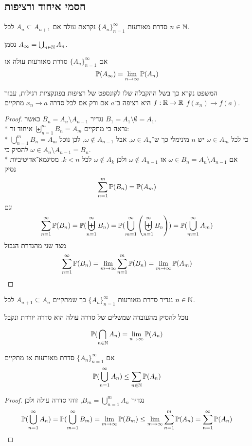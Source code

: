 \subsection{חסמי איחוד ורציפות}
\begin{definition}
	סדרת מאורעות ${\{A_n\}}_{n = 1}^\infty$ נקראת עולה אם $A_n \subseteq A_{n + 1}$ לכל $n \in \mathbb{N}$.
\end{definition}
\begin{notation}
	נסמן $A_\infty = \bigcup_{n \in \mathbb{N}} A_n$.
\end{notation}
\begin{theorem}
	אם ${\{A_n\}}_{n = 1}^\infty$ סדרת מאורעות עולה אז
	\[
		\mathbb{P}(A_\infty) = \lim_{n \to \infty} \mathbb{P}(A_n)
	\]
\end{theorem}
המשפט נקרא כך בשל ההקבלה שלו לקונספט של רציפות בפונקציות רגילות, עבור $f : \mathbb{R} \to \mathbb{R}$ היא רציפה ב־$a$ אם ורק אם לכל סדרה $x_n \to a$ מתקיים $f(x_n) \to f(a)$.
\begin{proof}
	נגדיר $B_n = A_n \setminus A_{n - 1}$ כאשר $B_1 = A_1 \setminus \emptyset = A_1$. \\*
	נראה כי מתקיים $\biguplus_{n = 1}^m B_n = A_m$ איחוד זר: \\*
	$\bigcup_{n = 1}^m B_n = A_m$ כי לכל $\omega \in A_m$ יש $n$ מינימלי כך ש־$\omega \in A_n$, אבל $\omega \notin A_{n - 1}$, לכן נוכל להסיק כי $\omega \in A_n \setminus A_{n - 1} = B_n$. \\*
	אם $\omega \in B_n = A_n \setminus A_{n - 1}$ אז $\omega \notin A_{n - 1}$ ולכן $\omega \notin A_k$ לכל $k < n$.
	מסיגמא־אדיטיביות נסיק
	\[
		\sum_{n = 1}^{m} \mathbb{P}(B_n) = \mathbb{P}(A_m)
	\]
	וגם
	\[
		\sum_{n = 1}^{\infty} \mathbb{P}(B_n)
		= \mathbb{P}(\biguplus_{n = 1}^\infty B_n)
		= \mathbb{P}(\bigcup_{m = 1}^\infty \left(\biguplus_{n = 1}^\infty B_n\right))
		= \mathbb{P}(\bigcup_{m = 1}^\infty A_m)
	\]
	מצד שני מהגדרת הגבול
	\[
		\sum_{n = 1}^{\infty} \mathbb{P}(B_n)
		= \lim_{m \to \infty} \sum_{n = 1}^{m}  \mathbb{P}(B_n)
		= \lim_{m \to \infty} \mathbb{P}(A_m)
	\]
\end{proof}
\begin{definition}
	נגדיר סדרת מאורעות ${\{A_n\}}_{n = 1}^\infty$ כך שמתקיים $A_{n + 1} \subseteq A_n$ לכל $n \in \mathbb{N}$.
\end{definition}
נוכל להסיק מהעובדה שמשלים של סדרה עולה הוא סדרה יורדת ונקבל
\begin{proposition}
	\[
		\mathbb{P}(\bigcap_{n \in \mathbb{N}} A_n) = \lim_{n \to \infty} \mathbb{P}(A_n)
	\]
\end{proposition}
\begin{proposition}
	אם ${\{A_n\}}_{n = 1}^\infty$ סדרת מאורעות אז מתקיים
	\[
		\mathbb{P}(\bigcup_{n = 1}^\infty A_n) \le \sum_{n \in \mathbb{N}} \mathbb{P}(A_n)
	\]
\end{proposition}
\begin{proof}
	נגדיר $B_m = \bigcup_{n = 1}^m A_n$, זוהי סדרה עולה ולכן
	\[
		\mathbb{P}(\bigcup_{n = 1}^\infty A_n)
		= \mathbb{P}(\bigcup_{m = 1}^\infty B_m)
		= \lim_{m \to \infty} \mathbb{P}(B_m)
		\le \lim_{m \to \infty} \sum_{n = 1}^{m} \mathbb{P}(A_n)
		= \sum_{n = 1}^{\infty} \mathbb{P}(A_n)
	\]
\end{proof}

